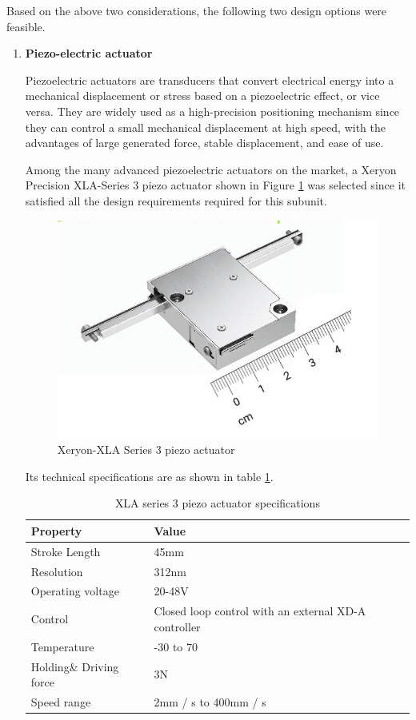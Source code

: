 Based on the above two considerations, the following two design options were feasible.
\begin{enumerate}
    \item \textbf{Piezo-electric actuator}
    \par
    Piezoelectric actuators are transducers that convert electrical energy into a mechanical displacement or stress based on a piezoelectric effect, or vice versa. They are widely used as a high-precision positioning mechanism since they can control a small mechanical displacement at high speed, with the advantages of large generated force, stable displacement, and ease of use\cite{gao2020piezoelectric}. 
    \par
    Among the many advanced piezoelectric actuators on the market, a Xeryon Precision XLA-Series 3 piezo actuator shown in Figure \ref{fig:piezo_actuator} was selected since it satisfied all the design requirements required for this subunit.
    \begin{figure}[H]
        \centering
        \includegraphics{Figures/Xeryon-XLA-3-1.png}
        \caption[Xeryon-XLA Series 3 piezo actuator]{Xeryon-XLA Series 3 piezo actuator \cite{xla3}}
        \label{fig:piezo_actuator}
    \end{figure}
    Its technical specifications are as shown in table \ref{tab:XLA_stuff}.
    \begin{table}[H]
    \centering
    \begin{tabular}{|l|l|}
    \hline
    \textbf{Property} & \textbf{Value} \\ \hline
    Stroke Length & 45mm \\ \hline
    Resolution & 312nm \\ \hline
    Operating voltage & 20-48V \\ \hline
    Control & Closed loop control with an external XD-A controller \\ \hline
    Temperature & -30  to 70 \\ \hline
    Holding\& Driving  force & 3N \\ \hline
    Speed range & 2mm / s to 400mm / s \\ \hline
    \end{tabular}
    \caption[XLA series 3 piezo actuator specifications]{XLA series 3 piezo actuator specifications \cite{xla3}}
    \label{tab:XLA_stuff}
    \end{table}
    

\end{enumerate}
